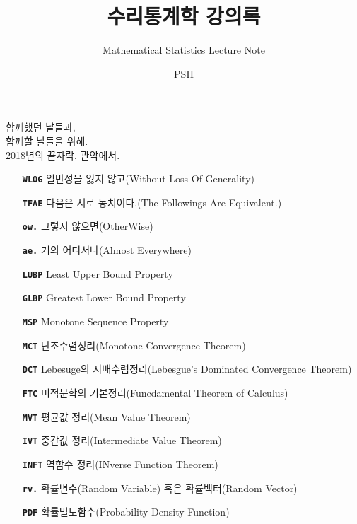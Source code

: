 \documentclass[graybox,envcountchap,envcountsame,sectrefs,fleqn]{svmono}
\begin{document}
\author{PSH}
\title{수리통계학 강의록}
\subtitle{Mathematical Statistics Lecture Note}
\maketitle

\frontmatter%

\extrachap{$ $}

\begin{flushright}
함께했던 날들과,\\
함께할 날들을 위해.\\
2018년의 끝자락, 관악에서.
\end{flushright}


\begin{itemize}
    \item[\texttt{\textbf{WLOG}}]{일반성을 잃지 않고(Without Loss Of Generality)}
    \item[\texttt{\textbf{TFAE}}]{다음은 서로 동치이다.(The Followings Are Equivalent.)}
    \item[\texttt{\textbf{ow.}}]{그렇지 않으면(OtherWise)}
    \item[\texttt{\textbf{ae.}}]{거의 어디서나(Almost Everywhere)}
    \item[\texttt{\textbf{LUBP}}]{Least Upper Bound Property}
    \item[\texttt{\textbf{GLBP}}]{Greatest Lower Bound Property}
    \item[\texttt{\textbf{MSP}}]{Monotone Sequence Property}
    \item[\texttt{\textbf{MCT}}]{단조수렴정리(Monotone Convergence Theorem)}
    \item[\texttt{\textbf{DCT}}]{Lebesuge의 지배수렴정리(Lebesgue's Dominated Convergence Theorem)}
    \item[\texttt{\textbf{FTC}}]{미적분학의 기본정리(Funcdamental Theorem of Calculus)}
    \item[\texttt{\textbf{MVT}}]{평균값 정리(Mean Value Theorem)}
    \item[\texttt{\textbf{IVT}}]{중간값 정리(Intermediate Value Theorem)}
    \item[\texttt{\textbf{INFT}}]{역함수 정리(INverse Function Theorem)}
    \item[\texttt{\textbf{rv.}}]{확률변수(Random Variable) 혹은 확률벡터(Random Vector)}
    \item[\texttt{\textbf{PDF}}]{확률밀도함수(Probability Density Function)}

\end{itemize}
\end{document}
